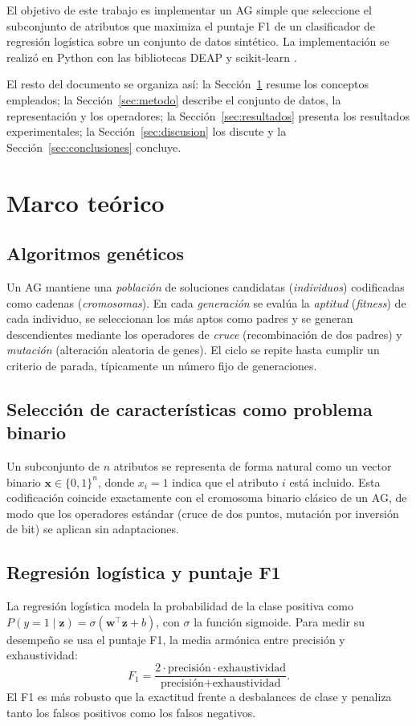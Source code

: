 \documentclass[conference]{IEEEtran}
\begin{document}
El objetivo de este trabajo es implementar un AG simple que seleccione el subconjunto de atributos que maximiza el puntaje F1 de un clasificador de regresión logística sobre un conjunto de datos sintético. La implementación se realizó en Python con las bibliotecas DEAP \cite{deap2012} y scikit-learn \cite{sklearn2011}.

El resto del documento se organiza así: la Sección~\ref{sec:marco} resume los conceptos empleados; la Sección~\ref{sec:metodo} describe el conjunto de datos, la representación y los operadores; la Sección~\ref{sec:resultados} presenta los resultados experimentales; la Sección~\ref{sec:discusion} los discute y la Sección~\ref{sec:conclusiones} concluye.

\section{Marco teórico}\label{sec:marco}

\subsection{Algoritmos genéticos}
Un AG mantiene una \emph{población} de soluciones candidatas (\emph{individuos}) codificadas como cadenas (\emph{cromosomas}). En cada \emph{generación} se evalúa la \emph{aptitud} (\emph{fitness}) de cada individuo, se seleccionan los más aptos como padres y se generan descendientes mediante los operadores de \emph{cruce} (recombinación de dos padres) y \emph{mutación} (alteración aleatoria de genes). El ciclo se repite hasta cumplir un criterio de parada, típicamente un número fijo de generaciones.

\subsection{Selección de características como problema binario}
Un subconjunto de $n$ atributos se representa de forma natural como un vector binario $\mathbf{x} \in \{0,1\}^n$, donde $x_i = 1$ indica que el atributo $i$ está incluido. Esta codificación coincide exactamente con el cromosoma binario clásico de un AG, de modo que los operadores estándar (cruce de dos puntos, mutación por inversión de bit) se aplican sin adaptaciones.

\subsection{Regresión logística y puntaje F1}
La regresión logística modela la probabilidad de la clase positiva como $P(y=1 \mid \mathbf{z}) = \sigma(\mathbf{w}^\top \mathbf{z} + b)$, con $\sigma$ la función sigmoide. Para medir su desempeño se usa el puntaje F1, la media armónica entre precisión y exhaustividad:
\begin{equation}
F_1 = \frac{2 \cdot \text{precisión} \cdot \text{exhaustividad}}{\text{precisión} + \text{exhaustividad}}.
\end{equation}
El F1 es más robusto que la exactitud frente a desbalances de clase y penaliza tanto los falsos positivos como los falsos negativos.
\end{document}

